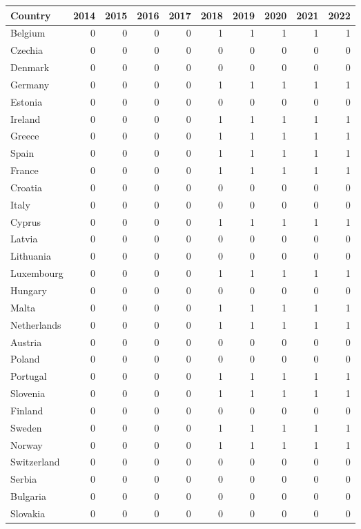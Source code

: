 \begin{tabular}{lrrrrrrrrr}
\toprule
Country & 2014 & 2015 & 2016 & 2017 & 2018 & 2019 & 2020 & 2021 & 2022 \\
\midrule
Belgium & 0 & 0 & 0 & 0 & 1 & 1 & 1 & 1 & 1 \\
Czechia & 0 & 0 & 0 & 0 & 0 & 0 & 0 & 0 & 0 \\
Denmark & 0 & 0 & 0 & 0 & 0 & 0 & 0 & 0 & 0 \\
Germany & 0 & 0 & 0 & 0 & 1 & 1 & 1 & 1 & 1 \\
Estonia & 0 & 0 & 0 & 0 & 0 & 0 & 0 & 0 & 0 \\
Ireland & 0 & 0 & 0 & 0 & 1 & 1 & 1 & 1 & 1 \\
Greece & 0 & 0 & 0 & 0 & 1 & 1 & 1 & 1 & 1 \\
Spain & 0 & 0 & 0 & 0 & 1 & 1 & 1 & 1 & 1 \\
France & 0 & 0 & 0 & 0 & 1 & 1 & 1 & 1 & 1 \\
Croatia & 0 & 0 & 0 & 0 & 0 & 0 & 0 & 0 & 0 \\
Italy & 0 & 0 & 0 & 0 & 0 & 0 & 0 & 0 & 0 \\
Cyprus & 0 & 0 & 0 & 0 & 1 & 1 & 1 & 1 & 1 \\
Latvia & 0 & 0 & 0 & 0 & 0 & 0 & 0 & 0 & 0 \\
Lithuania & 0 & 0 & 0 & 0 & 0 & 0 & 0 & 0 & 0 \\
Luxembourg & 0 & 0 & 0 & 0 & 1 & 1 & 1 & 1 & 1 \\
Hungary & 0 & 0 & 0 & 0 & 0 & 0 & 0 & 0 & 0 \\
Malta & 0 & 0 & 0 & 0 & 1 & 1 & 1 & 1 & 1 \\
Netherlands & 0 & 0 & 0 & 0 & 1 & 1 & 1 & 1 & 1 \\
Austria & 0 & 0 & 0 & 0 & 0 & 0 & 0 & 0 & 0 \\
Poland & 0 & 0 & 0 & 0 & 0 & 0 & 0 & 0 & 0 \\
Portugal & 0 & 0 & 0 & 0 & 1 & 1 & 1 & 1 & 1 \\
Slovenia & 0 & 0 & 0 & 0 & 1 & 1 & 1 & 1 & 1 \\
Finland & 0 & 0 & 0 & 0 & 0 & 0 & 0 & 0 & 0 \\
Sweden & 0 & 0 & 0 & 0 & 1 & 1 & 1 & 1 & 1 \\
Norway & 0 & 0 & 0 & 0 & 1 & 1 & 1 & 1 & 1 \\
Switzerland & 0 & 0 & 0 & 0 & 0 & 0 & 0 & 0 & 0 \\
Serbia & 0 & 0 & 0 & 0 & 0 & 0 & 0 & 0 & 0 \\
Bulgaria & 0 & 0 & 0 & 0 & 0 & 0 & 0 & 0 & 0 \\
Slovakia & 0 & 0 & 0 & 0 & 0 & 0 & 0 & 0 & 0 \\
\bottomrule
\end{tabular}
